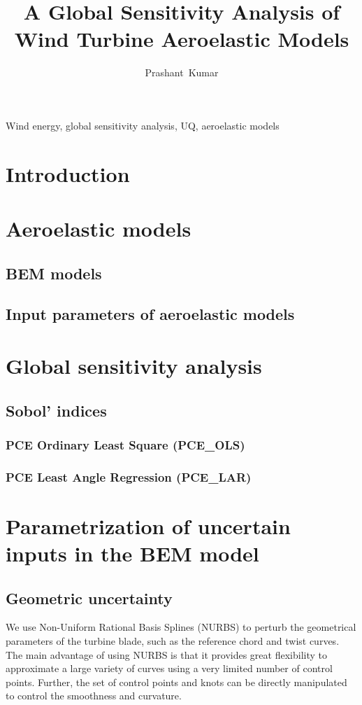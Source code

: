 \documentclass[review]{elsarticle}
\title{A Global Sensitivity Analysis of Wind Turbine Aeroelastic Models}
\numberwithin{equation}{section}
\numberwithin{equation}{section}
\begin{document}
\begin{frontmatter}
\author[]{Prashant~Kumar}
\begin{abstract}
\end{abstract}
\begin{keyword}
Wind energy, global sensitivity analysis, UQ, aeroelastic models 
\end{keyword}
\end{frontmatter}
\linenumbers
\section{Introduction}
\section{Aeroelastic models}
\subsection{BEM models}
\subsection{Input parameters of aeroelastic models}
\section{Global sensitivity analysis}
\subsection{Sobol' indices}
\subsubsection{PCE Ordinary Least Square (PCE\_OLS)}
\subsubsection{PCE Least Angle Regression (PCE\_LAR)}
\section{Parametrization of uncertain inputs in the BEM model}
\subsection{Geometric uncertainty}
We use Non-Uniform Rational Basis Splines (NURBS) \cite{nurbs_book} to perturb the geometrical parameters of the turbine blade, such as the reference chord and twist curves. The main advantage of using NURBS is that it provides great flexibility to approximate a large variety of curves using a very limited number of control points. Further, the set of control points and knots can be directly manipulated to control the smoothness and curvature.
\end{document}
